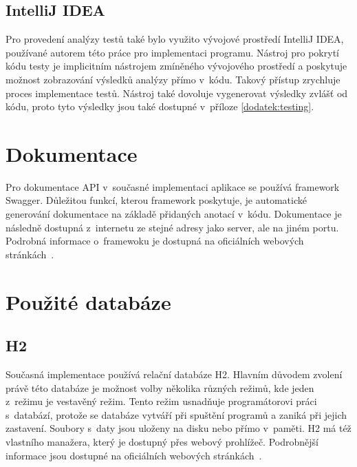     \subsection{IntelliJ IDEA}\label{resere:testovani:intellij-idea}
        Pro provedení analýzy testů také bylo využito vývojové prostředí IntelliJ IDEA, používané autorem této práce pro implementaci programu. Nástroj pro pokrytí kódu testy je implicitním nástrojem zmíněného vývojového prostředí a poskytuje možnost zobrazování výsledků analýzy přímo v~kódu. Takový přístup zrychluje proces implementace testů. Nástroj také dovoluje vygenerovat výsledky zvlášť od kódu, proto tyto výsledky jsou také dostupné v~příloze \ref{dodatek:testing}.


\section{Dokumentace}\label{resere:dokumentace}
    Pro dokumentace API v~současné implementaci aplikace se používá framework Swagger. Důležitou funkcí, kterou framework poskytuje, je automatické generování dokumentace na základě přidaných anotací v~kódu. Dokumentace je následně dostupná z~internetu ze stejné adresy jako server, ale na jiném portu. Podrobná informace o~framewoku je dostupná na oficiálních webových stránkách~\cite{swagger-doc}.
    
\section{Použité databáze}\label{resere:databaze}

    \subsection{H2}
        Současná implementace používá relační databáze H2. Hlavním důvodem zvolení právě této databáze je možnost volby několika různých režimů, kde jeden z~režimu je vestavěný režim. Tento režim usnadňuje programátorovi práci s~databází, protože se databáze vytváří při spuštění programů a zaniká při jejich zastavení. Soubory s~daty jsou uloženy na disku nebo přímo v~paměti. H2 má též vlastního manažera, který je dostupný přes webový prohlížeč. Podrobnější informace jsou dostupné na oficiálních webových stránkách~\cite{h2-doc}.
        
